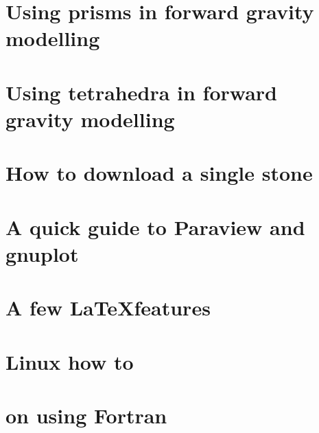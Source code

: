 \documentclass[a4paper]{article}
\numberwithin{equation}{section}
\begin{document}
\section{Using prisms in forward gravity modelling \label{app:prisms}} 
\newpage %
\section{Using tetrahedra in forward gravity modelling} \label{app:tetra} 
\newpage %
\section{How to download a single stone}  %
\newpage %
\section{A quick guide to Paraview and gnuplot} %
\newpage %
\section{A few \LaTeX features}  %
\newpage %
\section{Linux how to}  %
\newpage %
\section{on using Fortran}  %
\newpage %
\end{document}
